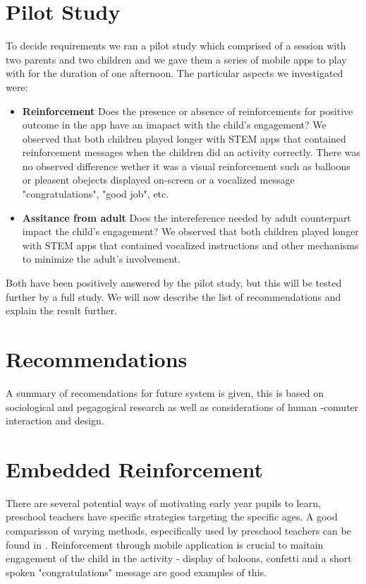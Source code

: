 \documentclass{sig-alternate}
\begin{document}
\section{Pilot Study}
To decide requirements we ran a pilot study which comprised of a session with two parents and two children and we gave them a series of mobile apps to play with for the duration of one afternoon. The particular aspects we investigated were:
\begin{itemize}
\item \textbf{Reinforcement} Does the presence or absence of reinforcements for positive outcome in the app have an imapact with the child's engagement? We observed that both children played longer with STEM apps that contained reinforcement messages when the children did an activity correctly. There was no observed difference wether it was a visual reinforcement such as balloons or pleasent obejects displayed on-screen or a vocalized message "congratulations", "good job", etc.
\item \textbf{Assitance from adult} Does the intereference needed by adult counterpart impact the child's engagement? We observed that both children played longer with STEM apps that contained vocalized instructions and other mechanisms to minimize the adult's involvement. 
\end{itemize}
Both have been positively answered by the pilot study, but this will be tested further by a full study. 
We will now describe the list of recommendations and explain the result further.


\section{Recommendations}
A summary of recomendations for future system is given, this is based on sociological and pegagogical research as well as considerations of human -comuter interaction and design. 

\section*{Embedded Reinforcement}
There are several potential ways of motivating early year pupils to learn, preschool teachers have specific strategies targeting the specific ages. A good comparisson of varying methods, especifically used by preschool teachers can be found in \cite{hanley2009influencing}. Reinforcement through mobile application is crucial to maitain engagement of the child in the activity - display of baloons, confetti and a short spoken "congratulations" message are good examples of this.
\end{document}
